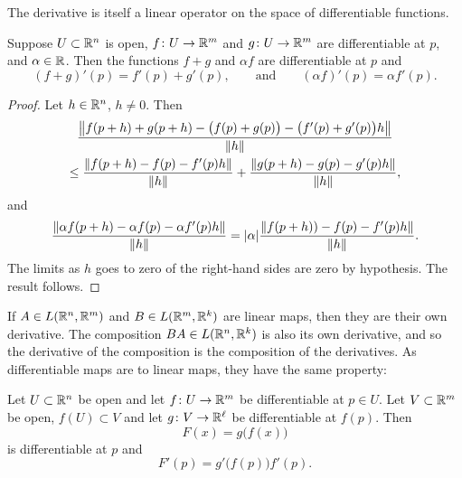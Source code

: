 The derivative is itself a linear operator on the space of differentiable
functions.

\begin{prop}
Suppose $U \subset {\mathbb{R}}^n$ is open,
$f \colon U \to {\mathbb{R}}^m$ and
$g \colon U \to {\mathbb{R}}^m$ are differentiable at $p$,
and $\alpha \in {\mathbb{R}}$.  Then the functions $f+g$ and $\alpha f$
are differentiable at $p$ and
\begin{equation*}
(f+g)'(p) = f'(p) + g'(p) , \qquad \text{and} \qquad (\alpha f)'(p) = \alpha
f'(p) .
\end{equation*}
\end{prop}

\begin{proof}
Let $h \in {\mathbb{R}}^n$, $h \not= 0$.  Then
\begin{multline*}
\frac{\left\lVert {f(p+h)+g(p+h)-\bigl(f(p)+g(p)\bigr) - \bigl(f'(p) + g'(p)\bigr)h} \right\rVert}{\lVert {h} \rVert}
\\
\leq
\frac{\left\lVert {f(p+h)-f(p) - f'(p)h} \right\rVert}{\lVert {h} \rVert}
+
\frac{\left\lVert {g(p+h)-g(p) - g'(p)h} \right\rVert}{\lVert {h} \rVert} ,
\end{multline*}
and
\begin{equation*}
\frac{\left\lVert {\alpha f(p+h) - \alpha f(p) - \alpha f'(p)h} \right\rVert}{\lVert {h} \rVert}
=
\lvert {\alpha} \rvert \frac{\left\lVert {f(p+h))-f(p) - f'(p)h} \right\rVert}{\lVert {h} \rVert} .
\end{equation*}
The limits as $h$ goes to zero of the right-hand sides are zero by
hypothesis.  The result follows.
\end{proof}

If $A \in L({\mathbb{R}}^n,{\mathbb{R}}^m)$ and $B \in L({\mathbb{R}}^m,{\mathbb{R}}^k)$ are linear maps, then 
they are their own derivative.  The composition
$BA \in L({\mathbb{R}}^n,{\mathbb{R}}^k)$ is also its own derivative, and
so the derivative of the composition is the composition
of the derivatives.  As differentiable maps are
to linear maps, they have the same property:

\begin{thm} 
Let $U \subset {\mathbb{R}}^n$ be open and let $f \colon U \to {\mathbb{R}}^m$ be
differentiable at $p \in U$.  Let $V \subset {\mathbb{R}}^m$ be open,
$f(U) \subset V$ and let $g \colon V \to {\mathbb{R}}^\ell$ be differentiable
at $f(p)$.  Then
\begin{equation*}
F(x) = g\bigl(f(x)\bigr)
\end{equation*}
is differentiable at $p$ and
\begin{equation*}
F'(p) = g'\bigl(f(p)\bigr) f'(p) .
\end{equation*}
\end{thm}

